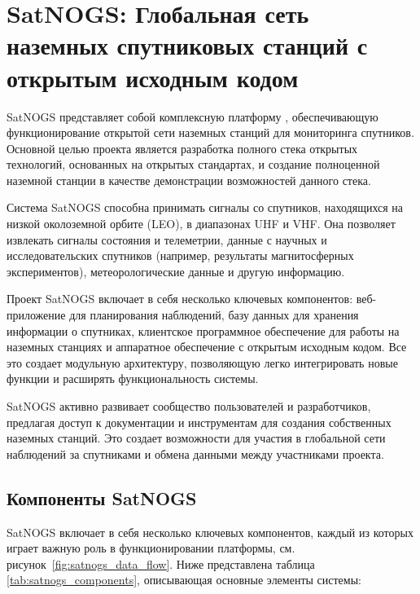 \chapter{SatNOGS: Глобальная сеть наземных спутниковых станций с открытым исходным кодом}

SatNOGS представляет собой комплексную платформу \cite{satnogs_general_docs},
обеспечивающую функционирование открытой сети наземных станций для мониторинга
спутников. Основной целью проекта является разработка полного стека открытых
технологий, основанных на открытых стандартах, и создание полноценной наземной
станции в качестве демонстрации возможностей данного стека.

Система SatNOGS способна принимать сигналы со спутников, находящихся на низкой
околоземной орбите (LEO), в диапазонах UHF и VHF. Она позволяет извлекать
сигналы состояния и телеметрии, данные с научных и исследовательских спутников
(например, результаты магнитосферных экспериментов), метеорологические данные и
другую информацию.

Проект SatNOGS включает в себя несколько ключевых компонентов: веб-приложение
для планирования наблюдений, базу данных для хранения информации о спутниках,
клиентское программное обеспечение для работы на наземных станциях и аппаратное
обеспечение с открытым исходным кодом. Все это создает модульную архитектуру,
позволяющую легко интегрировать новые функции и расширять функциональность
системы.

SatNOGS активно развивает сообщество пользователей и разработчиков, предлагая
доступ к документации и инструментам для создания собственных наземных станций.
Это создает возможности для участия в глобальной сети наблюдений за спутниками
и обмена данными между участниками проекта.

\section{Компоненты SatNOGS}

SatNOGS включает в себя несколько ключевых компонентов, каждый из которых играет
важную роль в функционировании платформы, см. рисунок~\ref{fig:satnogs_data_flow}.
Ниже представлена таблица \ref{tab:satnogs_components}, описывающая основные элементы системы:

